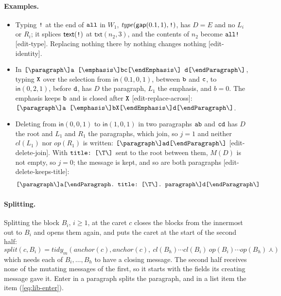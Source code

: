 \documentclass[11pt]{article}
\numberwithin{equation}{section}
\newcommand{\kw}[1]{\ensuremath{\mathsf{#1}}}
\newcommand{\str}[1]{\ensuremath{\text{\texttt{#1}}}}
\newcommand{\bs}{\textbackslash}
\newcommand{\crt}{\mathord{\curlywedge}}
\begin{document}
\paragraph{Examples.}
\begin{itemize}
\item Typing $\str{!}$ at the end of $\str{all}$ in $W_1$,
      $\mathit{type}(\kw{gap}(0.1, 1), \str{!})$, has $D = E$ and no $L_i$
      or $R_i$; it splices $\kw{text}(\str{!})$ at $\kw{txt}(n_2, 3)$, and
      the contents of $n_2$ become $\str{all!}$ [edit-type].  Replacing
      nothing there by nothing changes nothing [edit-identity].
\item In $\str{[\bs{}paragraph\bs]a\ [\bs{}emphasis\bs]bc[\bs{}endEmphasis\bs]\
      d[\bs{}endParagraph\bs]}$, typing $\str{X}$ over the selection from
      $\kw{in}(0.1, 0, 1)$, between $\str{b}$ and $\str{c}$, to
      $\kw{in}(0, 2, 1)$, before $\str{d}$, has $D$ the paragraph, $L_1$
      the emphasis, and $b = 0$.  The emphasis keeps $\str{b}$ and is
      closed after $\str{X}$ [edit-replace-across]:
      $\str{[\bs{}paragraph\bs]a\ [\bs{}emphasis\bs]bX[\bs{}endEmphasis\bs]d[\bs{}endParagraph\bs]}$.
\item Deleting from $\kw{in}(0, 0, 1)$ to $\kw{in}(1, 0, 1)$ in two
      paragraphs $\str{ab}$ and $\str{cd}$ has $D$ the root and $L_1$ and
      $R_1$ the paragraphs, which join, so $j = 1$ and neither
      $\mathit{cl}(L_1)$ nor $\mathit{op}(R_1)$ is written:
      $\str{[\bs{}paragraph\bs]ad[\bs{}endParagraph\bs]}$
      [edit-delete-join].  With $\str{title:\ [\bs{}T\bs]}$ sent to the
      root between them, $M(D)$ is not empty, so $j = 0$; the message is
      kept, and so are both paragraphs [edit-delete-keeps-title]:
      \[
      \str{[\bs{}paragraph\bs]a[\bs{}endParagraph.\ title:\
      [\bs{}T\bs].\ paragraph\bs]d[\bs{}endParagraph\bs]}
      \]
\end{itemize}

\paragraph{Splitting.}
Splitting the block $B_i$, $i \ge 1$, at the caret $c$ closes the blocks
from the innermost out to $B_i$ and opens them again, and puts the caret at
the start of the second half:
\begin{equation}\label{eq:edit-split}
\mathit{split}(c, B_i) = \mathit{tidy}_m(\mathit{anchor}(c),
  \mathit{anchor}(c),\ \mathit{cl}(B_h) \cdots \mathit{cl}(B_i)\
  \mathit{op}(B_i) \cdots \mathit{op}(B_h)\ \crt)
\end{equation}
which needs each of $B_i, \ldots, B_h$ to have a closing message.  The
second half receives none of the mutating messages of the first, so it
starts with the fields its creating message gave it.  Enter in a paragraph
splits the paragraph, and in a list item the item
(\ref{eq:lib-enter}).
\end{document}
